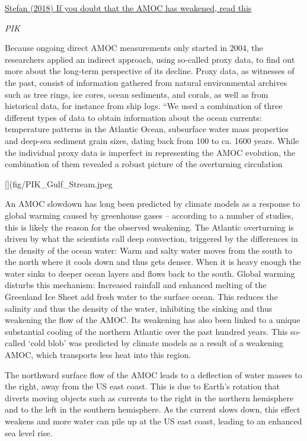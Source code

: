 \documentclass[
]{book}
\begin{document}
\href{https://www.realclimate.org/index.php/archives/2018/05/if-you-doubt-that-the-amoc-has-weakened-read-this/}{Stefan (2018) If you doubt that the AMOC has weakened, read this}

\emph{PIK}

Because ongoing direct AMOC measurements only started in 2004, the researchers applied an indirect approach, using so-called proxy data, to find out more about the long-term perspective of its decline. Proxy data, as witnesses of the past, consist of information gathered from natural environmental archives such as tree rings, ice cores, ocean sediments, and corals, as well as from historical data, for instance from ship logs.
``We used a combination of three different types of data to obtain information about the ocean currents: temperature patterns in the Atlantic Ocean, subsurface water mass properties and deep-sea sediment grain sizes, dating back from 100 to ca. 1600 years. While the individual proxy data is imperfect in representing the AMOC evolution, the combination of them revealed a robust picture of the overturning circulation

{[}{]}(fig/PIK\_Gulf\_Stream.jpeg

An AMOC slowdown has long been predicted by climate models as a response to global warming caused by greenhouse gases -- according to a number of studies, this is likely the reason for the observed weakening. The Atlantic overturning is driven by what the scientists call deep convection, triggered by the differences in the density of the ocean water: Warm and salty water moves from the south to the north where it cools down and thus gets denser. When it is heavy enough the water sinks to deeper ocean layers and flows back to the south. Global warming disturbs this mechanism: Increased rainfall and enhanced melting of the Greenland Ice Sheet add fresh water to the surface ocean. This reduces the salinity and thus the density of the water, inhibiting the sinking and thus weakening the flow of the AMOC.
Its weakening has also been linked to a unique substantial cooling of the northern Atlantic over the past hundred years. This so-called `cold blob' was predicted by climate models as a result of a weakening AMOC, which transports less heat into this region.

The northward surface flow of the AMOC leads to a deflection of water masses to the right, away from the US east coast. This is due to Earth's rotation that diverts moving objects such as currents to the right in the northern hemisphere and to the left in the southern hemisphere. As the current slows down, this effect weakens and more water can pile up at the US east coast, leading to an enhanced sea level rise.
\end{document}

